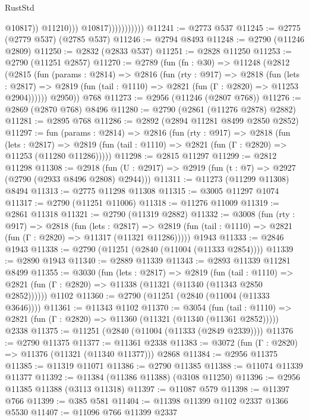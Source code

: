 \begin{lexlean}{RustStd}
\begin{coremodule}
                                    @10817))
                                @11210)))
                          @10817)))))))))))
@11241 := @2773 @537
@11245 := @2775 (@2779 @537) (@2785 @537)
@11246 := @2794 @8493
@11248 := @2790 (@11246 @2809)
@11250 := @2832 (@2833 @537)
@11251 := @2828 @11250
@11253 := @2790 (@11251 @2857)
@11270 := @2789
    (fun (fn : @30) =>
    @11248
      (@2812
        (@2815
          (fun (params : @2814) =>
          @2816
            (fun (rty : @917) =>
            @2818
              (fun (lets : @2817) =>
              @2819 (fun (tail : @1110) => @2821 (fun (Γ : @2820) => @11253 @2904))))))
        @2950))
    @768
@11273 := @2956 (@11246 (@2807 @768))
@11276 := @2869 (@2870 @768) @8496
@11280 := @2790 (@2861 (@11276 @2878) @2882)
@11281 := @2895 @768
@11286 := @2892 (@2894 @11281 @8499 @2850 @2852)
@11297 := fun (params : @2814) =>
  @2816
    (fun (rty : @917) =>
    @2818
      (fun (lets : @2817) =>
      @2819 (fun (tail : @1110) => @2821 (fun (Γ : @2820) => @11253 (@11280 @11286)))))
@11298 := @2815 @11297
@11299 := @2812 @11298
@11308 := @2918 (fun (U : @2917) => @2919 (fun (t : @7) => @2927 (@2790 (@2933 @8496 @2808) @2944)))
@11311 := @11273 (@11299 @11308) @8494
@11313 := @2775 @11298 @11308
@11315 := @3005 @11297 @1074
@11317 := @2790 (@11251 @11006)
@11318 := @11276 @11009
@11319 := @2861 @11318
@11321 := @2790 (@11319 @2882)
@11332 := @3008
    (fun (rty : @917) =>
    @2818
      (fun (lets : @2817) =>
      @2819 (fun (tail : @1110) => @2821 (fun (Γ : @2820) => @11317 (@11321 @11286)))))
    @1943
@11333 := @2846 @1943
@11338 := @2790 (@11251 (@2840 (@11004 (@11333 @2854))))
@11339 := @2890 @1943
@11340 := @2889 @11339
@11343 := @2893 @11339 @11281 @8499
@11355 := @3030
    (fun (lets : @2817) =>
    @2819
      (fun (tail : @1110) =>
      @2821 (fun (Γ : @2820) => @11338 (@11321 (@11340 (@11343 @2850 @2852))))))
    @1102
@11360 := @2790 (@11251 (@2840 (@11004 (@11333 @3646))))
@11361 := @11343 @1102
@11370 := @3054
    (fun (tail : @1110) => @2821 (fun (Γ : @2820) => @11360 (@11321 (@11340 (@11361 @2852)))))
    @2338
@11375 := @11251 (@2840 (@11004 (@11333 (@2849 @2339))))
@11376 := @2790 @11375
@11377 := @11361 @2338
@11383 := @3072 (fun (Γ : @2820) => @11376 (@11321 (@11340 @11377))) @2868
@11384 := @2956 @11375
@11385 := @11319 @11071
@11386 := @2790 @11385
@11388 := @11074 @11339 @11377
@11392 := @11384 (@11386 @11388) (@3108 @11250)
@11396 := @2956 @11385 @11388 (@3113 @11318)
@11397 := @11087 @579
@11398 := @11397 @766
@11399 := @385 @581
@11404 := @11398 @11399 @1102 @2337 @1366 @5530
@11407 := @11096 @766 @11399 @2337

\end{coremodule}
\end{lexlean}
